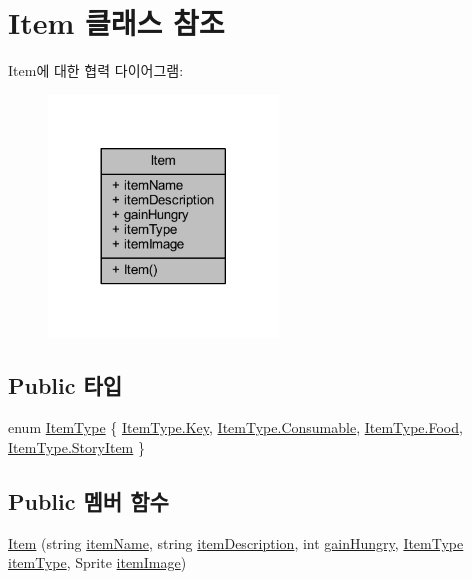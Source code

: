\hypertarget{class_item}{}\section{Item 클래스 참조}
\label{class_item}


Item에 대한 협력 다이어그램\+:\nopagebreak
\begin{figure}[H]
\begin{center}
\leavevmode
\includegraphics[width=173pt]{d2/d8b/class_item__coll__graph}
\end{center}
\end{figure}
\subsection*{Public 타입}
\begin{DoxyCompactItemize}
\item 
enum \mbox{\hyperlink{class_item_ab5eeb575e9d66ebcfef9b58b667fad05}{Item\+Type}} \{ \mbox{\hyperlink{class_item_ab5eeb575e9d66ebcfef9b58b667fad05a897356954c2cd3d41b221e3f24f99bba}{Item\+Type.\+Key}}, 
\mbox{\hyperlink{class_item_ab5eeb575e9d66ebcfef9b58b667fad05a56fed3bd1057fee3027e20901d42f19e}{Item\+Type.\+Consumable}}, 
\mbox{\hyperlink{class_item_ab5eeb575e9d66ebcfef9b58b667fad05a0a38e7286ebbb560354992b3ce62be67}{Item\+Type.\+Food}}, 
\mbox{\hyperlink{class_item_ab5eeb575e9d66ebcfef9b58b667fad05a7fe00998fa483a8ddbf6ed3fc10b9939}{Item\+Type.\+Story\+Item}}
 \}
\end{DoxyCompactItemize}
\subsection*{Public 멤버 함수}
\begin{DoxyCompactItemize}
\item 
\mbox{\hyperlink{class_item_af80ecbe70d40d1fe662e9e2d507b68b3}{Item}} (string \mbox{\hyperlink{class_item_a8c54f77a262b1ffd78c1cd8cbed86ae0}{item\+Name}}, string \mbox{\hyperlink{class_item_a1e47deb8739893cbfa26460cf4be4f00}{item\+Description}}, int \mbox{\hyperlink{class_item_abc2de92b7661dbc05ff5b7d445cae487}{gain\+Hungry}}, \mbox{\hyperlink{class_item_ab5eeb575e9d66ebcfef9b58b667fad05}{Item\+Type}} \mbox{\hyperlink{class_item_adbecc774c576b08f57f32655acf7363d}{item\+Type}}, Sprite \mbox{\hyperlink{class_item_aa189431b0e859890a3b9118da64cc484}{item\+Image}})
\end{DoxyCompactItemize}
